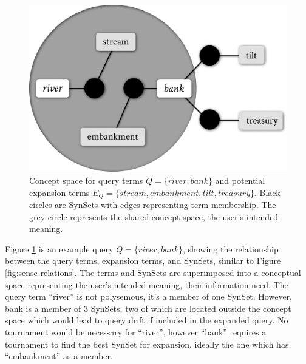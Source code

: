 
\begin{figure}
    \centering
    \includegraphics[width=0.7\linewidth]{graphics/concept-space.pdf}
    \caption{Concept space for query terms $Q = \{river, bank\}$ and potential expansion terms $E_Q = \{stream, embankment, tilt, treasury\}$. Black circles are SynSets with edges representing term membership. The grey circle represents the shared concept space, the user's intended meaning.}
    \label{fig:conceptspace}
\end{figure}

Figure \ref{fig:conceptspace} is an example query $Q = \{river, bank\}$, showing the relationship between the query terms, expansion terms, and SynSets, similar to Figure \ref{fig:sense-relations}. The terms and SynSets are superimposed into a conceptual space representing the user's intended meaning, their information need. The query term ``river'' is not polysemous, it's a member of one SynSet. However, bank is a member of 3 SynSets, two of which are located outside the concept space which would lead to query drift if included in the expanded query. No tournament would be necessary for ``river'', however ``bank'' requires a tournament to find the best SynSet for expansion, ideally the one which has ``embankment'' as a member.


